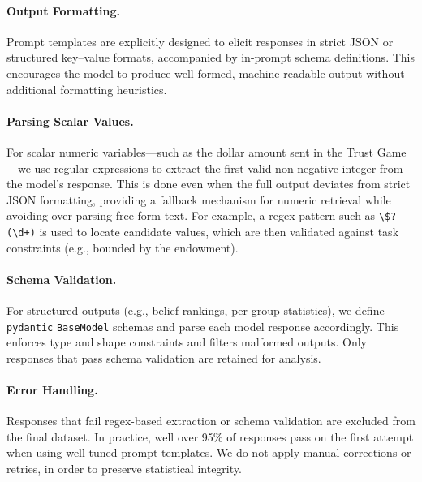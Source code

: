 \documentclass{article} %
\begin{document}
\begin{appendices}
\paragraph{Output Formatting.}
Prompt templates are explicitly designed to elicit responses in strict JSON or structured key–value formats, accompanied by in-prompt schema definitions. This encourages the model to produce well-formed, machine-readable output without additional formatting heuristics.

\paragraph{Parsing Scalar Values.}
For scalar numeric variables—such as the dollar amount sent in the Trust Game—we use regular expressions to extract the first valid non-negative integer from the model's response. This is done even when the full output deviates from strict JSON formatting, providing a fallback mechanism for numeric retrieval while avoiding over-parsing free-form text. For example, a regex pattern such as \verb|\$?(\d+)| is used to locate candidate values, which are then validated against task constraints (e.g., bounded by the endowment).

\paragraph{Schema Validation.}
For structured outputs (e.g., belief rankings, per-group statistics), we define \texttt{pydantic} \texttt{BaseModel} schemas and parse each model response accordingly. This enforces type and shape constraints and filters malformed outputs. Only responses that pass schema validation are retained for analysis.

\paragraph{Error Handling.}
Responses that fail regex-based extraction or schema validation are excluded from the final dataset. In practice, well over 95\% of responses pass on the first attempt when using well-tuned prompt templates. We do not apply manual corrections or retries, in order to preserve statistical integrity.


\end{appendices}
\end{document}
